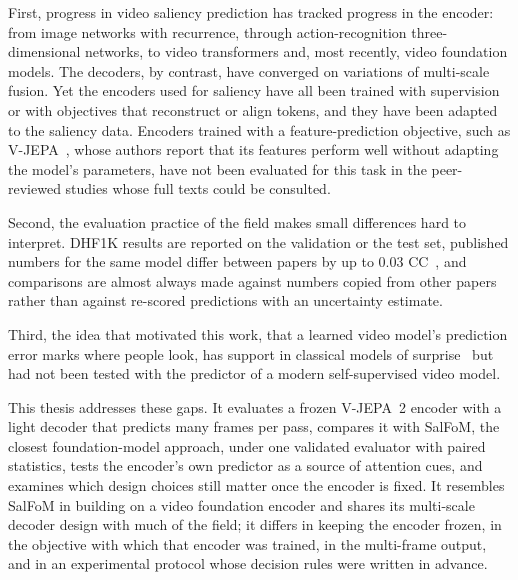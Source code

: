 First, progress in video saliency prediction has tracked progress in the
encoder: from image networks with recurrence, through action-recognition
three-dimensional networks, to video transformers and, most recently, video
foundation models. The decoders, by contrast, have converged on variations of
multi-scale fusion. Yet the encoders used for saliency have all been trained
with supervision or with objectives that reconstruct or align tokens, and they
have been adapted to the saliency data. Encoders trained with a
feature-prediction objective, such as \acrshort{V-JEPA}~\cite{bardes2024revisiting}, whose
authors report that its features perform well without adapting the model's
parameters, have not been evaluated for this task in the peer-reviewed studies
whose full texts could be consulted.

Second, the evaluation practice of the field makes small differences hard to
interpret. DHF1K results are reported on the validation or the test set,
published numbers for the same model differ between papers by up to 0.03
\acrshort{CC}~\cite{girmaji2025minimalistic,xiong2025unist}, and comparisons are almost
always made against numbers copied from other papers rather than against
re-scored predictions with an uncertainty estimate.

Third, the idea that motivated this work, that a learned video model's
prediction error marks where people look, has support in classical models of
surprise~\cite{itti2009bayesian} but had not been tested with the predictor of a
modern self-supervised video model.

This thesis addresses these gaps. It evaluates a frozen \acrshort{V-JEPA}~2 encoder with a
light decoder that predicts many frames per pass, compares it with SalFoM, the
closest foundation-model approach, under one validated evaluator with
paired statistics, tests the encoder's own predictor as a source of attention
cues, and examines which design choices still matter once the encoder is fixed.
It resembles SalFoM in building on a video foundation encoder and shares its
multi-scale decoder design with much of the field; it differs in keeping the
encoder frozen, in the objective with which that encoder was trained, in the
multi-frame output, and in an experimental protocol whose decision rules were
written in advance.
